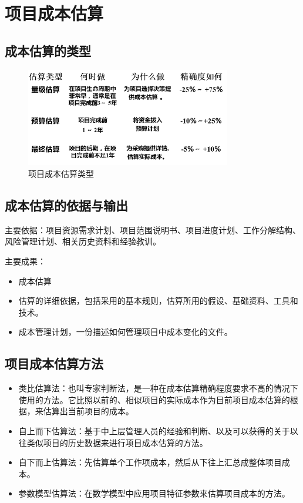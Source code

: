 \section{项目成本估算}
\subsection{成本估算的类型}
\begin{figure}[!h]
	\centering
	\includegraphics[width=0.8\textwidth]{image/6-2}
	\caption{项目成本估算类型}
\end{figure}
\subsection{成本估算的依据与输出}
主要依据：项目资源需求计划、项目范围说明书、项目进度计划、工作分解结构、
风险管理计划、相关历史资料和经验教训。
\par 主要成果：
\begin{itemize}
	\item 成本估算
	\item 估算的详细依据，包括采用的基本规则，估算所用的假设、基础资料、工具和技术。
	\item 成本管理计划，一份描述如何管理项目中成本变化的文件。
\end{itemize}
\subsection{项目成本估算方法}
\begin{itemize}
	\item 类比估算法：也叫专家判断法，是一种在成本估算精确程度要求不高的情况下使用的方法。它比照以前的、相似项目的实际成本作为目前项目成本估算的根据，来估算出当前项目的成本。
	\item 自上而下估算法：基于中上层管理人员的经验和判断、以及可以获得的关于以往类似项目的历史数据来进行项目成本估算的方法。
	\item 自下而上估算法：先估算单个工作项成本，然后从下往上汇总成整体项目成本。
	\item 参数模型估算法：在数学模型中应用项目特征参数来估算项目成本的方法。
\end{itemize}
